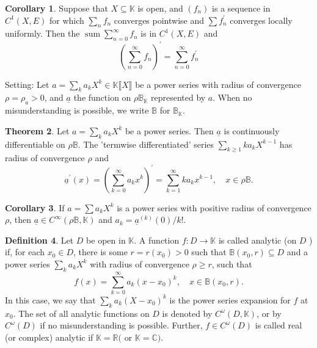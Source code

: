 \documentclass[12pt,a4paper]{book}
\theoremstyle{definition}
\newtheorem{defn}{Definition}[section]
\newtheorem{coro}[defn]{Corollary}
\newtheorem{theo}[defn]{Theorem}
\begin{document}
\begin{coro}
    Suppose that $X \subseteq \mathbb{K}$ is open, and $\left(f_n\right)$ is a sequence in $C^1(X, E)$ for which $\sum_n f_n$ converges pointwise and $\sum f_n^{\prime}$ converges locally uniformly. Then the $\operatorname{sum} \sum_{n=0}^{\infty} f_n$ is in $C^1(X, E)$ and
    $$
    \left(\sum_{n=0}^{\infty} f_n\right)^{\prime}=\sum_{n=0}^{\infty} f_n^{\prime}
    $$
    \label{corollary: sum of partial fn}
\end{coro}

Setting: Let $a=\sum_k a_k X^k \in \mathbb{K} \llbracket X \rrbracket$ be a power series with radius of convergence $\rho=\rho_a>0$, and $\underline{a}$ the function on $\rho \mathbb{B}_{\mathbb{K}}$ represented by $a$. When no misunderstanding is possible, we write $\mathbb{B}$ for $\mathbb{B}_{\mathbb{K}}$.
\begin{theo}
    Let $a=\sum_k a_k X^k$ be a power series. Then $\underline{a}$ is continuously differentiable on $\rho \mathbb{B}$. The 'termwise differentiated' series $\sum_{k \geq 1} k a_k X^{k-1}$ has radius of convergence $\rho$ and
    $$
    \underline{a}^{\prime}(x)=\left(\sum_{k=0}^{\infty} a_k x^k\right)^{\prime}=\sum_{k=1}^{\infty} k a_k x^{k-1}, \quad x \in \rho \mathbb{B} .
    $$
\end{theo}
\begin{coro}
    If $a=\sum a_k X^k$ is a power series with positive radius of convergence $\rho$, then $\underline{a} \in C^{\infty}(\rho \mathbb{B}, \mathbb{K})$ and $a_k=\underline{a}^{(k)}(0)/k!$.
\end{coro}
\begin{defn}
    Let $D$ be open in $\mathbb{K}$. A function $f: D \rightarrow \mathbb{K}$ is called analytic (on $D$ ) if, for each $x_0 \in D$, there is some $r=r\left(x_0\right)>0$ such that $\mathbb{B}\left(x_0, r\right) \subseteq D$ and a power series $\sum_k a_k X^k$ with radius of convergence $\rho \geq r$, such that
    $$
    f(x)=\sum_{k=0}^{\infty} a_k\left(x-x_0\right)^k, \quad x \in \mathbb{B}\left(x_0, r\right) .
    $$
    In this case, we say that $\sum_k a_k\left(X-x_0\right)^k$ is the power series expansion for $f$ at $x_0$. The set of all analytic functions on $D$ is denoted by $C^\omega(D, \mathbb{K})$, or by $C^\omega(D)$ if no misunderstanding is possible. Further, $f \in C^\omega(D)$ is called real (or complex) analytic if $\mathbb{K}=\mathbb{R}($ or $\mathbb{K}=\mathbb{C})$.
\end{defn}
\end{document}
